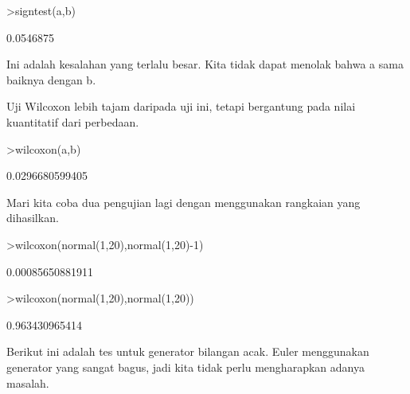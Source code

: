 \documentclass[a4paper,10pt]{article}
\begin{document}
\begin{eulernotebook}
\begin{eulercomment}
\begin{eulercomment}
\begin{eulercomment}
\begin{eulercomment}
\begin{eulercomment}
\begin{eulercomment}
\begin{eulercomment}
\begin{eulercomment}
\begin{eulercomment}
\begin{eulercomment}
\begin{eulercomment}
\begin{eulercomment}
\begin{eulercomment}
\begin{eulercomment}
\begin{eulercomment}
\begin{eulercomment}
\begin{eulercomment}
\begin{eulercomment}
\begin{eulercomment}
\begin{eulercomment}
\begin{eulerprompt}
>signtest(a,b)
\end{eulerprompt}
\begin{euleroutput}
  0.0546875
\end{euleroutput}
\begin{eulercomment}
Ini adalah kesalahan yang terlalu besar. Kita tidak dapat menolak
bahwa a sama baiknya dengan b.

Uji Wilcoxon lebih tajam daripada uji ini, tetapi bergantung pada
nilai kuantitatif dari perbedaan.
\end{eulercomment}
\begin{eulerprompt}
>wilcoxon(a,b)
\end{eulerprompt}
\begin{euleroutput}
  0.0296680599405
\end{euleroutput}
\begin{eulercomment}
Mari kita coba dua pengujian lagi dengan menggunakan rangkaian yang
dihasilkan.
\end{eulercomment}
\begin{eulerprompt}
>wilcoxon(normal(1,20),normal(1,20)-1)
\end{eulerprompt}
\begin{euleroutput}
  0.00085650881911
\end{euleroutput}
\begin{eulerprompt}
>wilcoxon(normal(1,20),normal(1,20))
\end{eulerprompt}
\begin{euleroutput}
  0.963430965414
\end{euleroutput}
\begin{eulercomment}
Berikut ini adalah tes untuk generator bilangan acak. Euler
menggunakan generator yang sangat bagus, jadi kita tidak perlu
mengharapkan adanya masalah.


\end{eulercomment}
\end{eulercomment}
\end{eulercomment}
\end{eulercomment}
\end{eulercomment}
\end{eulercomment}
\end{eulercomment}
\end{eulercomment}
\end{eulercomment}
\end{eulercomment}
\end{eulercomment}
\end{eulercomment}
\end{eulercomment}
\end{eulercomment}
\end{eulercomment}
\end{eulercomment}
\end{eulercomment}
\end{eulercomment}
\end{eulercomment}
\end{eulercomment}
\end{eulercomment}
\end{eulernotebook}
\end{document}
